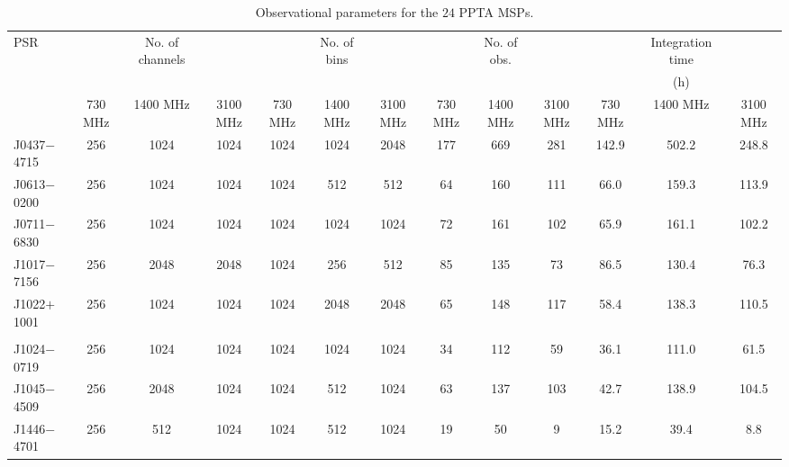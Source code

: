 \documentclass[useAMS,usenatbib]{mn2e}
\begin{document}
\begin{table}
\caption{Observational parameters for the $24$ PPTA MSPs.}
\label{obs}
\begin{center}
\begin{tabular}{lcccccccccccc}
\hline
PSR         &         & No. of channels &          &         & No. of bins &          &         & No. of obs. &          &         & Integration time &          \\
            &         &                 &          &         &             &          &         &             &          &         &   (h)            &       \\
            & 730 MHz &    1400 MHz     & 3100 MHz & 730 MHz &  1400 MHz   & 3100 MHz & 730 MHz &  1400 MHz   & 3100 MHz & 730 MHz &  1400 MHz        & 3100 MHz    \\
\hline
J0437$-$4715&  256    &    1024         &   1024   &  1024   &  1024       &  2048    &  177    &  669        & 281      &  142.9  &    502.2         &  248.8   \\
J0613$-$0200&  256    &    1024         &   1024   &  1024   &  512        &  512     &  64     &  160        & 111      &  66.0   &    159.3         &  113.9   \\
J0711$-$6830&  256    &    1024         &   1024   &  1024   &  1024       &  1024    &  72     &  161        & 102      &  65.9   &    161.1         &  102.2   \\
J1017$-$7156&  256    &    2048         &   2048   &  1024   &  256        &  512     &  85     &  135        & 73       &  86.5   &    130.4         &  76.3    \\
J1022$+$1001&  256    &    1024         &   1024   &  1024   &  2048       &  2048    &  65     &  148        & 117      &  58.4   &    138.3         &  110.5    \\
						&         &                 &          &         &             &          &         &             &          &         &                  &           \\
J1024$-$0719&  256    &    1024         &   1024   &  1024   &  1024       &  1024    &  34     &  112        & 59       &  36.1   &    111.0         &  61.5     \\
J1045$-$4509&  256    &    2048         &   1024   &  1024   &  512        &  1024    &  63     &  137        & 103      &  42.7   &    138.9         &  104.5    \\ 
J1446$-$4701&  256    &    512          &   1024   &  1024   &  512        &  1024    &  19     &  50         & 9        &  15.2   &    39.4          &  8.8    \\ 

\end{tabular}
\end{center}
\end{table}
\end{document}
